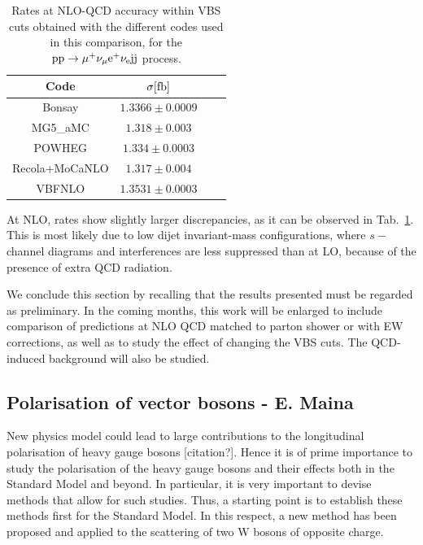 \begin{table}[h!]
    \centering
    \begin{tabular}{c|c|c|c}
        Code  &  $\sigma[\rm{fb}]$  \\
        \hline
        \hline
        {\sc Bonsay}  &  $1.3366 \pm 0.0009$  \\
        {\sc MG5\_aMC}&  $1.318  \pm 0.003$  \\
        {\sc POWHEG}  &  $1.334 \pm 0.0003$  \\
        {\sc Recola+MoCaNLO}  &  $1.317 \pm 0.004 $ \\
        {\sc VBFNLO}  &  $1.3531 \pm 0.0003$  \\
    \end{tabular}
    \caption{\label{tab:wg1_NLOrates} Rates at NLO-QCD accuracy within VBS cuts obtained with the different codes used in this comparison, 
    for the ${\rm p}{\rm p}\to\mu^+\nu_\mu{\rm e}^+\nu_{\rm e}{\rm j}{\rm j}$ process.}
\end{table}
At NLO, rates show slightly larger discrepancies, as it can be observed in Tab.~\ref{tab:wg1_NLOrates}. This is most likely due to low dijet invariant-mass configurations, where
$s-$channel diagrams and interferences are less suppressed than at LO, because of the presence of extra QCD radiation.

We conclude this section by recalling that the results presented must be regarded as preliminary.
In the coming months, this work will be enlarged to include comparison of predictions at NLO QCD matched to parton shower or with EW corrections, 
as well as to study the effect of changing 
the VBS cuts. The QCD-induced background will also be studied.

\subsection{Polarisation of vector bosons - E. Maina}

New physics model could lead to large contributions to the longitudinal polarisation of heavy gauge bosons [citation?].
Hence it is of prime importance to study the polarisation of the heavy gauge bosons and their effects both in the Standard Model and beyond.
In particular, it is very important to devise methods that allow for such studies.
Thus, a starting point is to establish these methods first for the Standard Model.
In this respect, a new method has been proposed and applied to the scattering of two W bosons of opposite charge.

